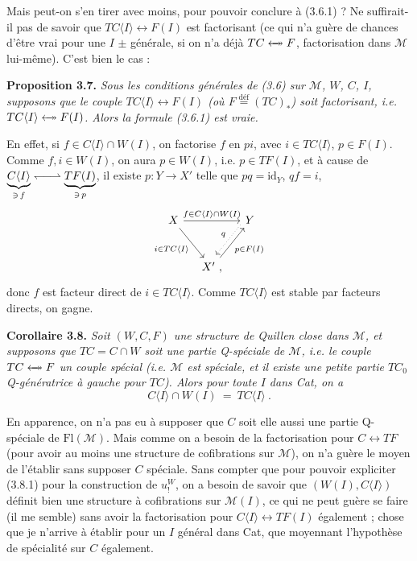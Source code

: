 \documentclass[11pt]{article}
\newcommand{\msp}[1]{\marginpar{\footnotesize [#1]}}
\newcommand{\M}{\mathcal{M}}
\newcommand{\Fl}{\mathrm{Fl}}
\newcommand{\harp}{\mathrel{\leftharpoondown\joinrel\relbar\joinrel\rightharpoonup}}
\newcommand{\deq}{\overset{\text{déf}}{=}}
\newcommand{\id}{\mathrm{id}}
\newcommand{\fact}{\mathrel{\leftarrow\mkern-11mu\twoheadrightarrow}}
\begin{document}
Mais peut-on s'en tirer avec moins, pour pouvoir conclure à (3.6.1) ? Ne suffirait-il pas de savoir que $TC\langle I\rangle\longleftrightarrow F(I)$ est factorisant (ce qui n'a guère de chances d'être vrai pour une $I$ $\pm$ générale, si on n'a déjà $TC\fact F$, factorisation dans $\M$ lui-même). C'est bien le cas :

\msp{page 41}
\textbf{Proposition 3.7.} \textit{Sous les conditions générales de \textup{(3.6)} sur $\M$, $W$, $C$, $I$, supposons que le couple $TC\langle I\rangle\longleftrightarrow F(I)$ (où $F\deq (TC)_*$) soit factorisant, i.e. $TC\langle I\rangle\fact F(I)$. Alors la formule \textup{(3.6.1)} est vraie.}

En effet, si $f\in C\langle I\rangle\cap W(I)$, on factorise $f$ en $pi$, avec $i\in TC\langle I\rangle$, $p\in F(I)$. Comme $f,i\in W(I)$, on aura $p\in W(I)$, i.e. $p\in TF(I)$, et à cause de $\underbrace{C\langle I\rangle}_{\ni\, f}\harp\underbrace{TF(I)}_{\ni\, p}$, il existe $p : Y\longrightarrow X'$ telle que $pq=\id_Y$, $qf=i$, %
\[
\begin{tikzcd}[column sep=small, row sep=large]
X \arrow[rr, "f\in C\langle I\rangle\cap W(I)"] \arrow[dr, "i\in TC\langle I\rangle"'] & & Y \arrow[dl, dotted, shift right=1ex, "q"'] \\
& X' \arrow[ur, "p\in F(I)"'] \ , &
\end{tikzcd}
\]
donc $f$ est facteur direct de $i\in TC\langle I\rangle$. Comme $TC\langle I\rangle$ est stable par facteurs directs, on gagne.

\textbf{Corollaire 3.8.} \textit{Soit $(W,C,F)$ une structure de Quillen close dans $\M$, et supposons que $TC=C\cap W$ soit une partie Q-spéciale de $\M$, i.e. le couple $TC\fact F$ un couple spécial (i.e. $\M$ est \textup{spéciale}, et il existe une petite partie $TC_0$ Q-génératrice à gauche pour $TC$). Alors pour toute $I$ dans \textup{Cat}, on a}
\[
C\langle I\rangle\cap W(I) \ = \ TC\langle I\rangle \ . \tag*{(3.8.1)}
\]

\msp{page 42}
En apparence, on n'a pas eu à supposer que $C$ soit elle aussi une partie Q-spéciale de $\Fl(\M)$. Mais comme on a besoin de la factorisation pour $C\longleftrightarrow TF$ (pour avoir au moins une structure de cofibrations sur $\M$), on n'a guère le moyen de l'établir sans supposer $C$ spéciale. Sans compter que pour pouvoir expliciter (3.8.1) pour la construction de $u^{W}_{!}$, on a besoin de savoir que $(W(I),C\langle I\rangle)$ définit bien une structure à cofibrations sur $\M(I)$, ce qui ne peut guère se faire (il me semble) sans avoir la factorisation pour $C\langle I\rangle\longleftrightarrow TF(I)$ également ; chose que je n'arrive à établir pour un $I$ général dans Cat, que moyennant l'hypothèse de spécialité sur $C$ également.
\end{document}
